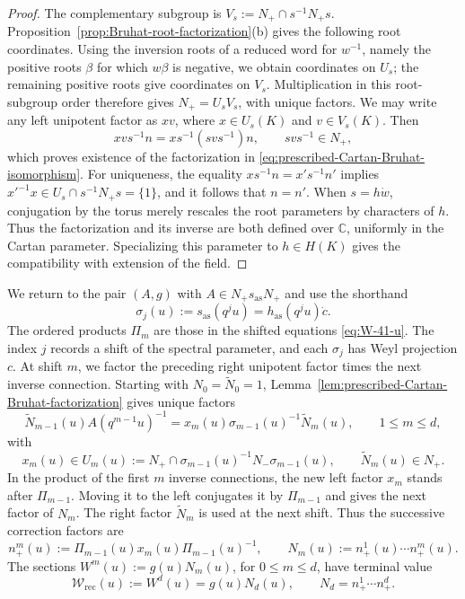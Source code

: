 \documentclass[11pt,leqno]{amsart}
\numberwithin{equation}{section}
\theoremstyle{plain}
\theoremstyle{definition}
\theoremstyle{plain}
\theoremstyle{definition}
\theoremstyle{remark}
\begin{document}
\begin{proof}
The complementary subgroup is $V_s:=N_+\cap s^{-1}N_+s$.  Proposition~\ref{prop:Bruhat-root-factorization}(b) gives the following root coordinates.  Using the inversion roots of a reduced word
for $w^{-1}$, namely the positive roots $\beta$ for which $w\beta$ is negative,
we obtain coordinates on $U_s$; the remaining positive roots
give coordinates on $V_s$.  Multiplication in this root-subgroup order
therefore gives $N_+=U_sV_s$, with unique factors.  We may write any
left unipotent factor as $xv$, where $x\in U_s(K)$ and $v\in V_s(K)$.  Then
\[
 xv s^{-1}n=x s^{-1}(s v s^{-1})n,
 \qquad s v s^{-1}\in N_+,
\]
which proves existence of the factorization in \eqref{eq:prescribed-Cartan-Bruhat-isomorphism}.
For uniqueness, the equality $xs^{-1}n=x's^{-1}n'$ implies
$x'^{-1}x\in U_s\cap s^{-1}N_+s=\{1\}$, and it follows that $n=n'$.
When $s=h\dot w$, conjugation by the torus merely rescales the root parameters
by characters of $h$.  Thus the factorization and its inverse are both
defined over $\mathbb C$, uniformly in the Cartan parameter.
Specializing this parameter to $h\in H(K)$ gives the compatibility with extension of the field.
\end{proof}

We return to the pair $(A,g)$ with $A\in N_+s_{\mathrm{as}}N_+$ and use the shorthand
\[
 \sigma_j(u):=s_{\mathrm{as}}(q^ju)=h_{\mathrm{as}}(q^ju)\dot c.
\]
The ordered products $\Pi_m$ are those in the shifted equations \eqref{eq:W-41-u}.  The index $j$ records a shift of the spectral parameter, and each $\sigma_j$ has Weyl projection $c$.
At shift $m$, we factor the preceding right unipotent factor times the next inverse connection.  Starting with $N_0=\widetilde N_0=1$, Lemma~\ref{lem:prescribed-Cartan-Bruhat-factorization} gives unique factors
\begin{equation}\label{eq:chosen-trivialization-recursive-factorization}
 \widetilde N_{m-1}(u)A(q^{m-1}u)^{-1}
 =x_m(u)\sigma_{m-1}(u)^{-1}\widetilde N_m(u),
 \qquad 1\le m\le d,
\end{equation}
with
\begin{equation}\label{eq:chosen-trivialization-one-step-layer}
 x_m(u)\in U_m(u):=N_+\cap \sigma_{m-1}(u)^{-1}N_-\sigma_{m-1}(u),
 \qquad \widetilde N_m(u)\in N_+.
\end{equation}
In the product of the first $m$ inverse connections, the new left factor $x_m$ stands after $\Pi_{m-1}$.  Moving it to the left conjugates it by $\Pi_{m-1}$ and gives the next factor of $N_m$.  The right factor $\widetilde N_m$ is used at the next shift.  Thus the successive correction factors are
\begin{equation}\label{eq:chosen-trivialization-new-layer}
 n_+^m(u):=\Pi_{m-1}(u)x_m(u)\Pi_{m-1}(u)^{-1},
 \qquad N_m(u):=n_+^1(u)\cdots n_+^m(u).
\end{equation}
The sections $W^m(u):=g(u)N_m(u)$, for $0\le m\le d$, have terminal value
\begin{equation}\label{eq:chosen-trivialization-terminal-section}
 \mathscr W_{\mathrm{rec}}(u):=W^d(u)=g(u)N_d(u),
 \qquad
 N_d=n_+^1\cdots n_+^d.
\end{equation}
\end{document}
